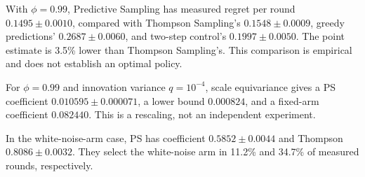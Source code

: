 With $\phi=0.99$, Predictive Sampling has measured regret per round $0.1495\pm0.0010$, compared with Thompson Sampling's $0.1548\pm0.0009$, greedy predictions' $0.2687\pm0.0060$, and two-step control's $0.1997\pm0.0050$. The point estimate is 3.5\% lower than Thompson Sampling's. This comparison is empirical and does not establish an optimal policy.

For $\phi=0.99$ and innovation variance $q=10^{-4}$, scale equivariance gives a PS coefficient $0.010595\pm0.000071$, a lower bound $0.000824$, and a fixed-arm coefficient $0.082440$. This is a rescaling, not an independent experiment.

In the white-noise-arm case, PS has coefficient $0.5852\pm0.0044$ and Thompson $0.8086\pm0.0032$. They select the white-noise arm in 11.2\% and 34.7\% of measured rounds, respectively.

